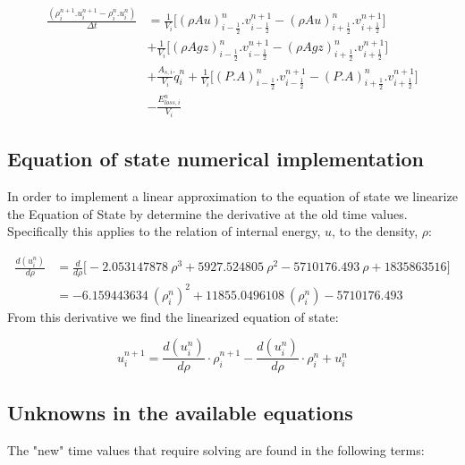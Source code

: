 \documentclass[11pt,letterpaper,titlepage]{article}
\newcommand{\half}{\frac{1}{2}}
\begin{document}
\begin{equation}
\begin{aligned}
\frac{(\rho_i^{n+1}.u_i^{n+1}-  \rho_i^{n}.u_i^{n})}{\Delta t}&=\frac{1}{V_i}\biggr[ (\rho Au)_{i-\half}^n.v_{i-\half}^{n+1} -(\rho Au)_{i+\half}^n.v_{i+\half}^{n+1} \biggr] \\
&+\frac{1}{V_i}\biggr[ (\rho Agz)_{i-\half}^n.v_{i-\half}^{n+1} -(\rho Agz)_{i+\half}^n.v_{i+\half}^{n+1} \biggr] \\
&+\frac{A_{s,i}}{V_i}\dot{q}_i^n + \frac{1}{V_i}\biggr[   (P.A)_{i-\half}^n.v_{i-\half}^{n+1} - (P.A)_{i+\half}^n.v_{i+\half}^{n+1}   \biggr] \\
&- \frac{E_{loss,i}^n}{V_i}
\end{aligned}
\end{equation}


\newpage
\subsection{Equation of state numerical implementation}
In order to implement a linear approximation to the equation of state we linearize the Equation of State by determine the derivative at the old time values. Specifically this applies to the relation of internal energy, $u$, to the density, $\rho$:

\begin{equation*}
\begin{aligned}
\frac{d(u_i^{n})}{d\rho}&=\frac{d}{d\rho} \biggr[  -2.053147878 \ \rho^3+5927.524805 \ \rho^2-5710176.493 \ \rho+1835863516    \biggr] \\
                          &=-6.159443634 \ (\rho_{i}^{n})^2+11855.0496108 \ (\rho_{i}^{n})-5710176.493 
\end{aligned}
\end{equation*}
\newline
From this derivative we find the linearized equation of state:

\begin{equation}
u_{i}^{n+1} = \frac{d(u_i^{n})}{d\rho}\cdot \rho_{i}^{n+1} -\frac{d(u_i^{n})}{d\rho}\cdot\rho_{i}^{n} +  u_{i}^{n}   
\end{equation}






\newpage
\subsection{Unknowns in the available equations}
The "new" time values that require solving are found in the following terms:
\end{document}
